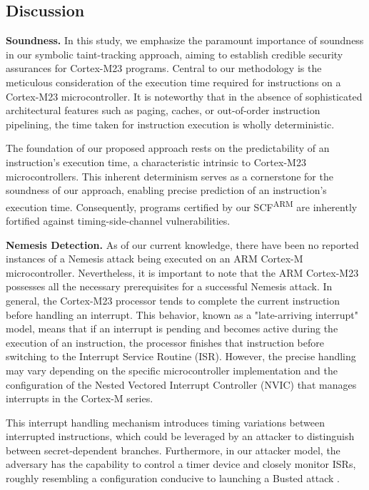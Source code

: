 \subsection{Discussion}

\textbf{Soundness.} In this study, we emphasize the paramount importance of soundness in our symbolic taint-tracking approach, aiming to establish credible security assurances for Cortex-M23 programs. Central to our methodology is the meticulous consideration of the execution time required for instructions on a Cortex-M23 microcontroller. It is noteworthy that in the absence of sophisticated architectural features such as paging, caches, or out-of-order instruction pipelining, the time taken for instruction execution is wholly deterministic.

The foundation of our proposed approach rests on the predictability of an instruction's execution time, a characteristic intrinsic to Cortex-M23 microcontrollers. This inherent determinism serves as a cornerstone for the soundness of our approach, enabling precise prediction of an instruction's execution time. Consequently, programs certified by our \ac{SCF}\textsuperscript{ARM} are inherently fortified against timing-side-channel vulnerabilities.

\textbf{Nemesis Detection.} As of our current knowledge, there have been no reported instances of a Nemesis attack being executed on an ARM Cortex-M microcontroller. Nevertheless, it is important to note that the ARM Cortex-M23 possesses all the necessary prerequisites for a successful Nemesis attack. In general, the Cortex-M23 processor tends to complete the current instruction before handling an interrupt. This behavior, known as a "late-arriving interrupt" model, means that if an interrupt is pending and becomes active during the execution of an instruction, the processor finishes that instruction before switching to the Interrupt Service Routine (\ac{ISR}). However, the precise handling may vary depending on the specific microcontroller implementation and the configuration of the Nested Vectored Interrupt Controller (NVIC) that manages interrupts in the Cortex-M series.

This interrupt handling mechanism introduces timing variations between
interrupted instructions, which could be leveraged by an attacker to
distinguish between secret-dependent branches. Furthermore, in our attacker
model, the adversary has the capability to control a timer device and
closely monitor \acp{ISR}, roughly resembling a configuration conducive to launching a Busted attack \cite{busted}.


